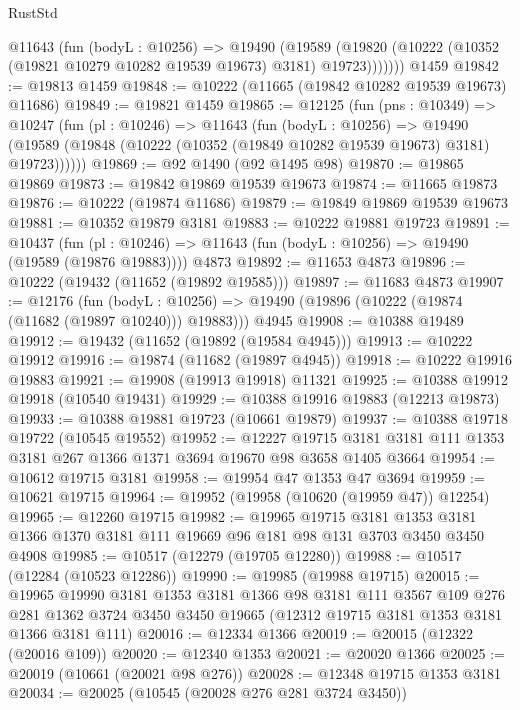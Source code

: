 \begin{lexlean}{RustStd}
\begin{coremodule}
        @11643
          (fun (bodyL : @10256) =>
          @19490
            (@19589
              (@19820 (@10222 (@10352 (@19821 @10279 @10282 @19539 @19673) @3181) @19723)))))))
    @1459
@19842 := @19813 @1459
@19848 := @10222 (@11665 (@19842 @10282 @19539 @19673) @11686)
@19849 := @19821 @1459
@19865 := @12125
    (fun (pns : @10349) =>
    @10247
      (fun (pl : @10246) =>
      @11643
        (fun (bodyL : @10256) =>
        @19490 (@19589 (@19848 (@10222 (@10352 (@19849 @10282 @19539 @19673) @3181) @19723))))))
@19869 := @92 @1490 (@92 @1495 @98)
@19870 := @19865 @19869
@19873 := @19842 @19869 @19539 @19673
@19874 := @11665 @19873
@19876 := @10222 (@19874 @11686)
@19879 := @19849 @19869 @19539 @19673
@19881 := @10352 @19879 @3181
@19883 := @10222 @19881 @19723
@19891 := @10437
    (fun (pl : @10246) => @11643 (fun (bodyL : @10256) => @19490 (@19589 (@19876 @19883))))
    @4873
@19892 := @11653 @4873
@19896 := @10222 (@19432 (@11652 (@19892 @19585)))
@19897 := @11683 @4873
@19907 := @12176
    (fun (bodyL : @10256) => @19490 (@19896 (@10222 (@19874 (@11682 (@19897 @10240))) @19883)))
    @4945
@19908 := @10388 @19489
@19912 := @19432 (@11652 (@19892 (@19584 @4945)))
@19913 := @10222 @19912
@19916 := @19874 (@11682 (@19897 @4945))
@19918 := @10222 @19916 @19883
@19921 := @19908 (@19913 @19918) @11321
@19925 := @10388 @19912 @19918 (@10540 @19431)
@19929 := @10388 @19916 @19883 (@12213 @19873)
@19933 := @10388 @19881 @19723 (@10661 @19879)
@19937 := @10388 @19718 @19722 (@10545 @19552)
@19952 := @12227
    @19715
    @3181
    @3181
    @111
    @1353
    @3181
    @267
    @1366
    @1371
    @3694
    @19670
    @98
    @3658
    @1405
    @3664
@19954 := @10612 @19715 @3181
@19958 := @19954 @47 @1353 @47 @3694
@19959 := @10621 @19715
@19964 := @19952 (@19958 (@10620 (@19959 @47)) @12254)
@19965 := @12260 @19715
@19982 := @19965
    @19715
    @3181
    @1353
    @3181
    @1366
    @1370
    @3181
    @111
    @19669
    @96
    @181
    @98
    @131
    @3703
    @3450
    @3450
    @4908
@19985 := @10517 (@12279 (@19705 @12280))
@19988 := @10517 (@12284 (@10523 @12286))
@19990 := @19985 (@19988 @19715)
@20015 := @19965
    @19990
    @3181
    @1353
    @3181
    @1366
    @98
    @3181
    @111
    @3567
    @109
    @276
    @281
    @1362
    @3724
    @3450
    @3450
    @19665
    (@12312 @19715 @3181 @1353 @3181 @1366 @3181 @111)
@20016 := @12334 @1366
@20019 := @20015 (@12322 (@20016 @109))
@20020 := @12340 @1353
@20021 := @20020 @1366
@20025 := @20019 (@10661 (@20021 @98 @276))
@20028 := @12348 @19715 @1353 @3181
@20034 := @20025 (@10545 (@20028 @276 @281 @3724 @3450))

\end{coremodule}
\end{lexlean}
